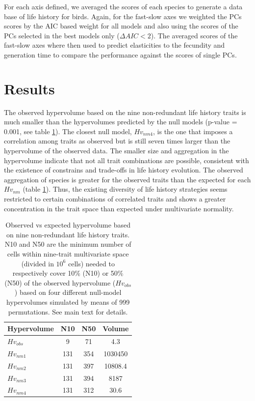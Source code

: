 For each axis defined, we averaged the scores of each species to generate a data
base of life history for birds. Again, for the fast-slow axes we weighted the
PCs scores by the AIC based weight for all models and also using the scores of
the PCs selected in the best models only ($\Delta AIC < 2$). The averaged scores
of the fast-slow axes where then used to predict elasticities to the fecundity
and generation time to compare the performance against the scores of single PCs.


\section{Results}

The observed hypervolume based on the nine non-redundant life history traits is
much smaller than the hypervolumes predicted by the null models (p-value = 
0.001, see table \ref{tab:table2.2}). The closest null model, $Hv_{nm4}$, is
the one that imposes a correlation among traits as observed but is still seven
times larger than the hypervolume of the observed data. The smaller size and
aggregation in the hypervolume indicate that not all trait combinations are 
possible, consistent with the existence of constrains and trade-offs in life
history evolution. The observed aggregation of species is greater for the 
observed traits than the expected for each $Hv_{nm}$ (table
\ref{tab:table2.2}). Thus, the existing diversity of life history strategies 
seems restricted to certain combinations of correlated traits and shows a 
greater concentration in the trait space than expected under multivariate 
normality.

\begin{table}
\center
\caption[Species' concentration and hypervolumes]{Observed vs expected
hypervolume based on nine non-redundant life history traits. N10 and N50 are the
minimum number of cells within nine-trait multivariate space (divided in $10^6$
cells) needed to respectively cover 10\% (N10) or 50\% (N50) of the observed
hypervolume ($Hv_{obs}$) based on four different null-model hypervolumes
simulated by means of 999 permutations. See main text for details.
}
\label{tab:table2.2}
\begin{tabular}[b]{@{}lccc@{}}
\toprule
\textbf{Hypervolume} & \textbf{N10} & \textbf{N50} & \textbf{Volume} \\
\midrule
$Hv_{obs}$  & 9   & 71  & 4.3 \\
$Hv_{nm1}$  & 131 & 354 & 1030450 \\
$Hv_{nm2}$  & 131 & 397 & 10808.4 \\
$Hv_{nm3}$  & 131 & 394 & 8187 \\
$Hv_{nm4}$  & 131 & 312 & 30.6 \\
\bottomrule
\end{tabular}
\end{table}

